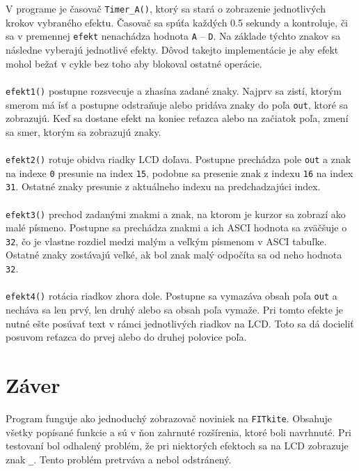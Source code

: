 \documentclass[10pt,a4paper,final]{article}
\begin{document}
\\\\
V programe je časovač \texttt{Timer\_A()}, ktorý sa stará o zobrazenie jednotlivých krokov vybraného efektu. Časovač sa spúťa každých 0.5 sekundy a kontroluje, či sa v premennej \texttt{efekt} nenachádza hodnota \texttt{A} -- \texttt{D}. Na základe týchto znakov sa následne vyberajú jednotlivé efekty. Dôvod takejto implementácie je aby efekt mohol bežať v cykle bez toho aby blokoval ostatné operácie.
\\\\
\texttt{efekt1()} postupne rozsvecuje a zhasína zadané znaky. Najprv sa zistí, ktorým smerom má ísť a postupne odstraňuje alebo pridáva znaky do poľa \texttt{out}, ktoré sa zobrazujú. Keď sa dostane efekt na koniec reťazca alebo na začiatok poľa, zmení sa smer, ktorým sa zobrazujú znaky.
\\\\
\texttt{efekt2()} rotuje obidva riadky LCD doľava. Postupne prechádza pole \texttt{out} a znak na indexe \texttt{0} presunie na index \texttt{15}, podobne sa presenie znak z indexu \texttt{16} na index \texttt{31}. Ostatné znaky presunie z aktuálneho indexu na predchadzajúci index.
\\\\
\texttt{efekt3()} prechod zadanými znakmi a znak, na ktorom je kurzor sa zobrazí ako malé písmeno. Postupne sa prechádza znakmi a ich ASCI hodnota sa zväčšuje o \texttt{32}, čo je vlastne rozdiel medzi malým a veľkým písmenom v ASCI tabuľke. Ostatné znaky zostávajú veľké, ak bol znak malý odpočíta sa od neho hodnota \texttt{32}.
\\\\
\texttt{efekt4()} rotácia riadkov zhora dole. Postupne sa vymazáva obsah poľa \texttt{out} a necháva sa len prvý, len druhý alebo sa obsah poľa vymaže. Pri tomto efekte je nutné ešte posúvať text v rámci jednotlivých riadkov na LCD. Toto sa dá docieliť posuvom reťazca do prvej alebo do druhej polovice poľa.

\section{Záver}
Program funguje ako jednoduchý zobrazovač noviniek na \texttt{FITkite}. Obsahuje všetky popísané funkcie a sú v ňon zahrnuté rozšírenia, ktoré boli navrhnuté. Pri testovaní bol odhalený problém, že pri niektorých efektoch sa na LCD zobrazuje znak \texttt{\_}. Tento problém pretrváva a nebol odstránený.



\newpage

\renewcommand{\refname}{Literatúra}
\raggedright

\end{document}
